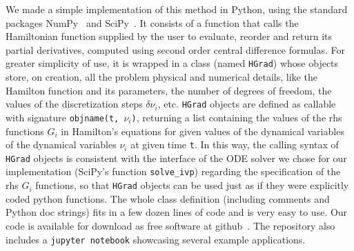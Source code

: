 \documentclass{iopart}
\begin{document}



We made a simple implementation of this method in Python, using the standard
packages NumPy~\cite{numpy:2011,numpy:2020} and SciPy~\cite{scipy}.  It
consists of a function that calls the Hamiltonian function supplied by
the user to evaluate, reorder and return its partial derivatives, computed using
second order central difference formulas.
%
%
For greater simplicity of use, it is wrapped in a class (named \texttt{HGrad})
whose objects store, on creation, all the problem physical and numerical
details, like the Hamilton function and its parameters, the number of degrees of
freedom, the values of the discretization steps $\delta\nu_i$, etc.
\texttt{HGrad} objects are defined as callable with signature \texttt{objname(t,
$\nu_i$)}, returning a list containing the values of the rhs functions $G_i$ in
Hamilton's equations for given values of the dynamical variables of the
dynamical variables $\nu_i$ at given time \texttt{t}. In this way, the calling
syntax of \texttt{HGrad} objects is consistent with the interface of the ODE
solver we chose for our implementation (SciPy's function \texttt{solve\_ivp})
regarding the specification of the rhs $G_i$ functions, so that
\texttt{HGrad} objects can be used
just as if they were explicitly coded python functions.  The whole class
definition (including comments and Python doc strings) fits in a few dozen lines
of code and is very easy to use.  Our code is available for download as free
software at github~\cite{nevh:2020}.  The repository also includes a
\texttt{jupyter notebook} showcasing several example applications.
\end{document}
